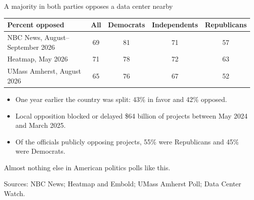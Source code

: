 \documentclass[aspectratio=169,11pt]{beamer}
\begin{document}
\begin{frame}{A majority in both parties opposes a data center nearby}

\begin{center}
\footnotesize
\begin{tabular}{@{}lcccc@{}}
\toprule
\textbf{Percent opposed} & \textbf{All} & \textbf{Democrats} & \textbf{Independents} & \textbf{Republicans} \\
\midrule
NBC News, August--September 2026 & 69 & 81 & 71 & 57 \\
Heatmap, May 2026 & 71 & 78 & 72 & 63 \\
UMass Amherst, August 2026 & 65 & 76 & 67 & 52 \\
\bottomrule
\end{tabular}
\end{center}

\vspace{0.2cm}

\begin{itemize}\setlength\itemsep{0.2em}
    \item One year earlier the country was split: 43\% in favor and 42\% opposed.
    \item Local opposition blocked or delayed \$64 billion of projects between May 2024 and March 2025.
    \item Of the officials publicly opposing projects, 55\% were Republicans and 45\% were Democrats.
\end{itemize}

\vspace{0.25cm}

\alert{Almost nothing else in American politics polls like this.}

\vspace{0.1cm}
{\scriptsize\color{warmgray}Sources: NBC News; Heatmap and Embold; UMass Amherst Poll; Data Center Watch.}

\end{frame}
\end{document}
